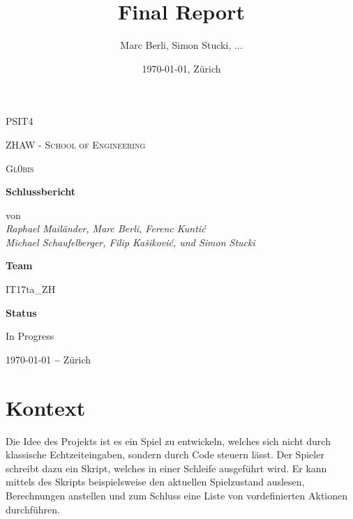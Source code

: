 \documentclass[a4paper, 11pt]{scrartcl}
\title{Final Report}
\author{Marc Berli, Simon Stucki, ...}
\date{\today{}, Zürich}
\let\oldsection\section
\renewcommand\section{\clearpage\oldsection}
\begin{document}
\begin{titlepage}
\centering
{\scshape\LARGE PSIT4 \par}
\vspace{1cm}
{\scshape ZHAW - School of Engineering\par}
\vspace{1cm}
{\scshape\Large Gl0bis\par}
\vspace{1.5cm}
{\huge\bfseries Schlussbericht\par}
\vspace{2cm}
von
\vspace{1em}
\Large\itshape \\ Raphael Mailänder, Marc Berli, Ferenc Kuntić \\ Michael Schaufelberger, Filip Kašiković, und Simon Stucki\par
\vfill
\textbf{Team}\par
IT17ta\_ZH\par
\vspace{2em}
\textbf{Status}\par
In Progress

\vfill

{\large \today \textbf{ --} Zürich\par}
\end{titlepage}

\tableofcontents

\newpage

\section{Kontext}

Die Idee des Projekts ist es ein Spiel zu entwickeln,
welches sich nicht durch klassische Echtzeiteingaben,
sondern durch Code steuern lässt.
Der Spieler schreibt dazu ein Skript,
welches in einer Schleife ausgeführt wird.
Er kann mittels des Skripts beispielsweise den aktuellen Spielzustand auslesen,
Berechnungen anstellen und zum Schluss eine Liste von vordefinierten Aktionen durchführen.
\end{document}
